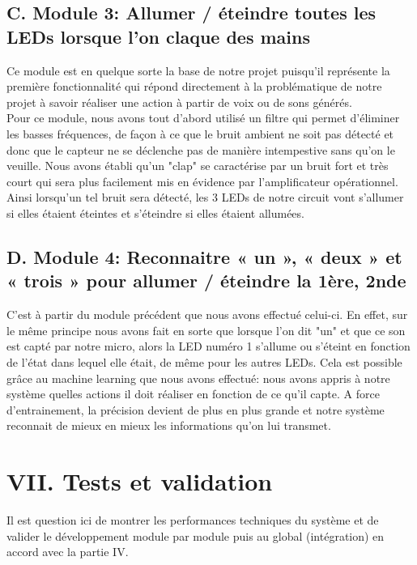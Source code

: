 \documentclass[a4paper,11pt]{book}
\begin{document}
\subsection*{C. Module 3: Allumer / éteindre toutes les LEDs lorsque l’on claque des mains }

Ce module est en quelque sorte la base de notre projet puisqu'il représente la première fonctionnalité qui répond directement à la problématique de notre projet à savoir réaliser une action à partir de voix ou de sons générés. \\ 
Pour ce module, nous avons tout d'abord utilisé un filtre qui permet d'éliminer les basses fréquences, de façon à ce que le bruit ambient ne soit pas détecté et donc que le capteur ne se déclenche pas de manière intempestive sans qu'on le veuille. Nous avons établi qu'un "clap" se caractérise par un bruit fort et très court qui sera plus facilement mis en évidence par l'amplificateur opérationnel. Ainsi lorsqu'un tel bruit sera détecté, les 3 LEDs de notre circuit vont s'allumer si elles étaient éteintes et s'éteindre si elles étaient allumées. \\ 

\subsection*{D. Module 4: Reconnaitre « un », « deux » et « trois » pour allumer / éteindre la 1ère, 2nde }

C'est à partir du module précédent que nous avons effectué celui-ci. En effet, sur le même principe nous avons fait en sorte que lorsque l'on dit "un" et que ce son est capté par notre micro, alors la LED numéro 1 s'allume ou s'éteint en fonction de l'état dans lequel elle était, de même pour les autres LEDs. Cela est possible grâce au machine learning que nous avons effectué: nous avons appris à notre système quelles actions il doit réaliser en fonction de ce qu'il capte. A force d'entrainement, la précision devient de plus en plus grande et notre système reconnait de mieux en mieux les informations qu'on lui transmet.


\newpage
\section*{VII. Tests et validation}

\vspace{2mm}
\noindent Il est question ici de montrer les performances techniques du système et de valider le développement module par module puis au global (intégration) en accord avec la partie IV.
\end{document}
